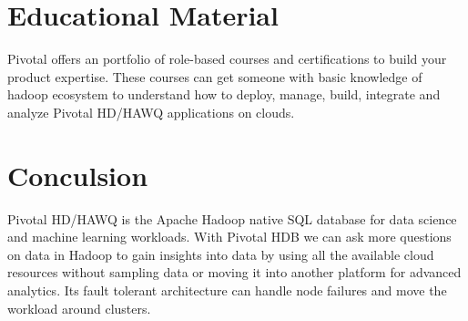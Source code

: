 \documentclass[9pt,twocolumn,twoside]{../../styles/osajnl}
\begin{document}
\section{Educational Material}

{Pivotal offers an portfolio of role-based courses and certifications 
to build your product expertise}\cite{www-pivotal-courses}. These 
courses can get someone with basic knowledge of hadoop ecosystem  to 
understand how to deploy, manage, build, integrate and analyze 
Pivotal HD/HAWQ applications on clouds. 

\section{Conculsion}

Pivotal HD/HAWQ is the Apache Hadoop native SQL database for data 
science and machine learning workloads. With Pivotal HDB we can ask 
more questions on data in Hadoop to gain insights into data by using 
all the available cloud resources without sampling data or moving it 
into another platform for advanced analytics. Its fault tolerant 
architecture can handle node failures and move the workload around 
clusters.


\end{document}
